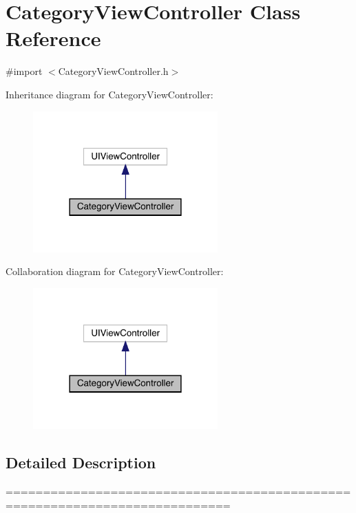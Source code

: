 \hypertarget{interface_category_view_controller}{}\section{Category\+View\+Controller Class Reference}
\label{interface_category_view_controller}


{\ttfamily \#import $<$Category\+View\+Controller.\+h$>$}



Inheritance diagram for Category\+View\+Controller\+:\nopagebreak
\begin{figure}[H]
\begin{center}
\leavevmode
\includegraphics[width=201pt]{interface_category_view_controller__inherit__graph}
\end{center}
\end{figure}


Collaboration diagram for Category\+View\+Controller\+:\nopagebreak
\begin{figure}[H]
\begin{center}
\leavevmode
\includegraphics[width=201pt]{interface_category_view_controller__coll__graph}
\end{center}
\end{figure}


\subsection{Detailed Description}
============================================================================

